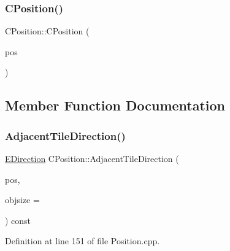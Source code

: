 \subsubsection{\texorpdfstring{C\+Position()}{CPosition()}\hspace{0.1cm}{\footnotesize\ttfamily [3/3]}}
{\footnotesize\ttfamily C\+Position\+::\+C\+Position (\begin{DoxyParamCaption}\item[{const \hyperlink{classCPosition}{C\+Position} \&}]{pos }\end{DoxyParamCaption})\hspace{0.3cm}{\ttfamily [default]}}



\subsection{Member Function Documentation}
\hypertarget{classCPosition_a2295901e4c35cfc81304f9a217e34ac7}{}\label{classCPosition_a2295901e4c35cfc81304f9a217e34ac7} 
\subsubsection{\texorpdfstring{Adjacent\+Tile\+Direction()}{AdjacentTileDirection()}}
{\footnotesize\ttfamily \hyperlink{GameDataTypes_8h_acb2b033915f6659a71a38b5aa6e4eb42}{E\+Direction} C\+Position\+::\+Adjacent\+Tile\+Direction (\begin{DoxyParamCaption}\item[{const \hyperlink{classCPosition}{C\+Position} \&}]{pos,  }\item[{int}]{objsize = {} }\end{DoxyParamCaption}) const}



Definition at line 151 of file Position.\+cpp.


